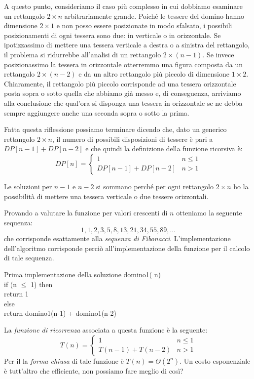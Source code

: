 A questo punto, consideriamo il caso più complesso in cui dobbiamo esaminare un
rettangolo $2\times n$ arbitrariamente grande. Poiché le tessere del domino hanno
dimensione $2\times1$ e non posso essere posizionate in modo sfalsato, i
possibili posizionamenti di ogni tessera sono due: in verticale o in orizzontale.
Se ipotizzassimo di mettere una tessera verticale a destra o a sinistra del
rettangolo, il problema si ridurrebbe all'analisi di un rettangolo $2\times(n-1)$.
Se invece posizionassimo la tessera in orizzontale otterremmo una figura composta
da un rettangolo $2\times(n-2)$ e da un altro rettangolo più piccolo di
dimensione $1\times2$. Chiaramente, il rettangolo più piccolo corrisponde ad una
tessera orizzontale posta sopra o sotto quella che abbiamo già messo e, di
conseguenza, arriviamo alla conclusione che qual'ora si disponga una tessera in
orizzontale se ne debba sempre aggiungere anche una seconda sopra o sotto la prima.

\noindent
Fatta questa riflessione possiamo terminare dicendo che, dato un
generico rettangolo $2\times n$, il numero di possibili disposizioni di tessere
è pari a $DP[n-1]+DP[n-2]$ e che quindi la definizione della funzione ricorsiva
è:
\[DP[n]=\begin{cases}
    1 & n\leq1\\
    DP[n-1]+DP[n-2] & n>1
\end{cases}\]
\begin{note}
    Le soluzioni per $n-1$ e $n-2$ si sommano perché per ogni rettangolo $2\times
    n$ ho la possibilità di mettere una tessera verticale o due tessere orizzontali.
\end{note}

\bigskip\noindent
Provando a valutare la funzione per valori crescenti di $n$ otteniamo la
seguente sequenza:
\[1,1,2,3,5,8,13,21,34,55,89,\dots\]
che corrisponde esattamente alla \emph{sequenza di Fibonacci}. L'implementazione
dell'algoritmo corrisponde perciò all'implementazione della funzione per il
calcolo di tale sequenza.

\begin{minicode}{Prima implementazione della soluzione}
    \ind{} domino1( n)\\
        \indf if (n $\leq$ 1) then\\
            return 1\\
        \indf else\\
            return domino1(n-1) + domino1(n-2)
\end{minicode}\noindent
La \emph{funzione di ricorrenza} associata a questa funzione è la seguente:
\[T(n)=\begin{cases}
    1 & n\leq1\\
    T(n-1)+T(n-2) & n>1
\end{cases}\]
Per il \emph{} la \emph{forma chiusa} di tale funzione è
$T(n)=\Theta(2^n)$. Un costo esponenziale è tutt'altro che efficiente, non
possiamo fare meglio di così?

